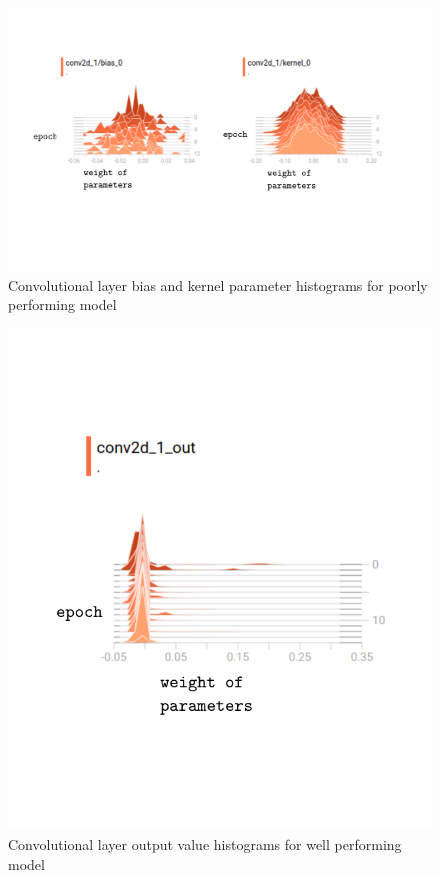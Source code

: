\documentclass{article}
\begin{document}
\begin{figure}[h]
  \includegraphics[width=\linewidth]{badearlyweights.pdf}
  \caption{Convolutional layer bias and kernel parameter histograms for poorly performing model}
  \label{fig:badearlyweights}
\end{figure}

\begin{figure}[h]
  \includegraphics[scale=0.8]{goodearlyout.pdf}
  \caption{Convolutional layer output value histograms for well performing model}
  \label{fig:goodearlyout}
\end{figure}
\end{document}
